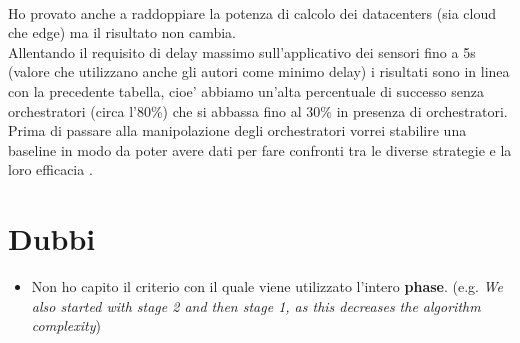 \documentclass[12pt, a4paper]{report} %
\begin{document}
\begin{itemize}
	\\
	Ho provato anche a raddoppiare la potenza di calcolo dei datacenters (sia cloud che edge) ma il risultato non cambia.
	\\
	Allentando il requisito di delay massimo sull'applicativo dei sensori fino a 5s (valore che utilizzano anche gli autori come minimo delay) i risultati sono in linea con la precedente tabella, cioe' abbiamo un'alta percentuale di successo senza orchestratori (circa l'80\%) che si abbassa fino al 30\% in presenza di orchestratori.\\
Prima di passare alla manipolazione degli orchestratori vorrei stabilire una baseline in modo da poter avere dati per fare confronti tra le diverse strategie e la loro efficacia .

\end{itemize}
\section*{Dubbi}
\begin{itemize}
	\item Non ho capito il criterio con il quale viene utilizzato l'intero \textbf{phase}. (e.g. \textit{We also started with stage 2 and then stage 1, as this decreases the algorithm complexity})
\end{itemize}
\end{document}

